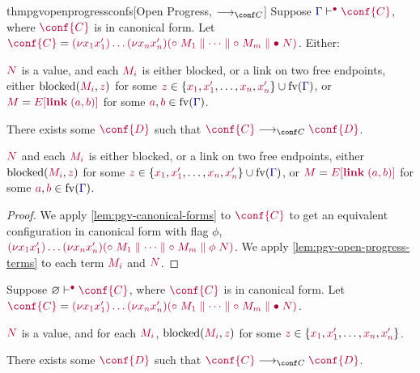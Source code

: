 \documentclass[main.tex]{subfiles}
\begin{document}
\begin{restatabletheorem}{thmpgvopenprogressconfs}[Open Progress, $\cred$]
  \label{thm:pgv-open-progress-confs}
  Suppose $\cseq[\main]{\ty{\Gamma}}{\conf{C}}$, where $\tm{\conf{C}}$ is in canonical form.
  Let $\tm{\conf{C}}=\tm{\res{x_1}{x'_1}{\dots\res{x_n}{x'_n}{(\child\;M_1\parallel\dots\parallel\child\;M_m\parallel\main\;N)}}}$.
  Either:
  \begin{description}[labelwidth=8ex]
  \item[Done]
    $\tm{N}$ is a value, and each $\tm{M_i}$ is either blocked, or a link on two free endpoints, \ie either $\blocked\pair{\tm{M_i}}{\tm{z}}$ for some $\tm{z}\in\{\tm{x_1},\tm{x'_1},\dots,\tm{x_n},\tm{x'_n}\}\cup\fv(\ty{\Gamma})$, or $\tm{M}=\tm{\plug{E}{\link\;\pair{a}{b}}}$ for some $\tm{a},\tm{b}\in\fv(\ty{\Gamma})$.
  \item[Step]
    There exists some $\tm{\conf{D}}$ such that $\tm{\conf{C}} \cred \tm{\conf{D}}$.
  \item[Blocked]
    $\tm{N}$ and each $\tm{M_i}$ is either blocked, or a link on two free endpoints, \ie either $\blocked\pair{\tm{M_i}}{\tm{z}}$ for some $\tm{z}\in\{\tm{x_1},\tm{x'_1},\dots,\tm{x_n},\tm{x'_n}\}\cup\fv(\ty{\Gamma})$, or $\tm{M}=\tm{\plug{E}{\link\;\pair{a}{b}}}$ for some $\tm{a},\tm{b}\in\fv(\ty{\Gamma})$.
  \end{description}
\end{restatabletheorem}
\begin{proof}
  We apply \cref{lem:pgv-canonical-forms} to $\tm{\conf{C}}$ to get an equivalent configuration in canonical form with flag $\phi$, $\tm{\res{x_1}{x'_1}{\dots\res{x_n}{x'_n}{(\child\;M_1\parallel\dots\parallel\child\;M_m\parallel\phi\;N)}}}$.
  We apply \cref{lem:pgv-open-progress-terms} to each term $\tm{M_i}$ and $\tm{N}$.
\end{proof}


\begin{corollary}
  \label{thm:pgv-closed-progress-confs}
  Suppose $\cseq[\main]{\emptyenv}{\conf{C}}$, where $\tm{\conf{C}}$ is in canonical form.
  Let $\tm{\conf{C}}=\tm{\res{x_1}{x'_1}{\dots\res{x_n}{x'_n}{(\child\;M_1\parallel\dots\parallel\child\;M_m\parallel\main\;N)}}}$.
  \begin{description}[labelwidth=8ex]
  \item[Done]
    $\tm{N}$ is a value, and for each $\tm{M_i}$, $\blocked\pair{\tm{M_i}}{\tm{z}}$ for some $\tm{z}\in\{\tm{x_1},\tm{x'_1},\dots,\tm{x_n},\tm{x'_n}\}$.
  \item[Step]
    There exists some $\tm{\conf{D}}$ such that $\tm{\conf{C}} \cred \tm{\conf{D}}$.
  \end{description}
\end{corollary}
\end{document}
